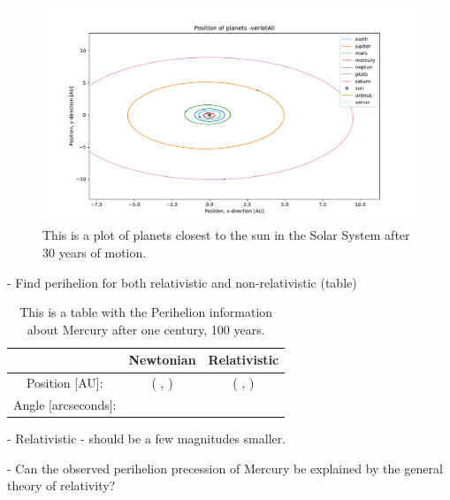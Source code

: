 \begin{figure}[H]
\includegraphics[width=1\linewidth]{../results/plots/innerplanets-verletAll.pdf}\caption{This is a plot of planets closest to the sun in the Solar System after 30 years of motion.}\label{fig:solarsystem_innerplanets}
\end{figure}
	
	- Find perihelion for both relativistic and non-relativistic (table)
	
\begin{table}\caption{This is a table with the Perihelion information about Mercury after one century, 100 years.}\label{tab:Perihelion}
\begin{tabular}{ccc}
 & Newtonian & Relativistic\\ \hline
Position [AU]: & ( , ) & ( , )\\
Angle [arcseconds]: & & \\
\end{tabular}
\end{table}

	- Relativistic - should be a few magnitudes smaller.	

	-  Can the observed perihelion
precession of Mercury be explained by the general theory of relativity?
